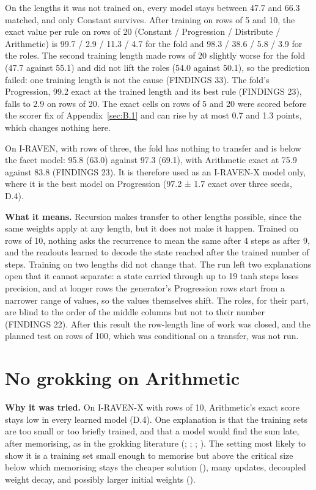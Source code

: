 On the lengths it was not trained on, every model stays between 47.7 and 66.3 matched, and only Constant survives. After training on rows of 5 and 10, the exact value per rule on rows of 20 (Constant / Progression / Distribute / Arithmetic) is 99.7 / 2.9 / 11.3 / 4.7 for the fold and 98.3 / 38.6 / 5.8 / 3.9 for the roles. The second training length made rows of 20 slightly worse for the fold (47.7 against 55.1) and did not lift the roles (54.0 against 50.1), so the prediction failed: one training length is not the cause (FINDINGS 33). The fold's Progression, 99.2 exact at the trained length and its best rule (FINDINGS 23), falls to 2.9 on rows of 20. The exact cells on rows of 5 and 20 were scored before the scorer fix of Appendix~\ref{sec:B.1} and can rise by at most 0.7 and 1.3 points, which changes nothing here.

On I-RAVEN, with rows of three, the fold has nothing to transfer and is below the facet model: 95.8 (63.0) against 97.3 (69.1), with Arithmetic exact at 75.9 against 83.8 (FINDINGS 23). It is therefore used as an I-RAVEN-X model only, where it is the best model on Progression (97.2 ± 1.7 exact over three seeds, D.4).

\textbf{What it means.} Recursion makes transfer to other lengths possible, since the same weights apply at any length, but it does not make it happen. Trained on rows of 10, nothing asks the recurrence to mean the same after 4 steps as after 9, and the readouts learned to decode the state reached after the trained number of steps. Training on two lengths did not change that. The run left two explanations open that it cannot separate: a state carried through up to 19 tanh steps loses precision, and at longer rows the generator's Progression rows start from a narrower range of values, so the values themselves shift. The roles, for their part, are blind to the order of the middle columns but not to their number (FINDINGS 22). After this result the row-length line of work was closed, and the planned test on rows of 100, which was conditional on a transfer, was not run.

\section{No grokking on Arithmetic}\label{sec:E.2}

\textbf{Why it was tried.} On I-RAVEN-X with rows of 10, Arithmetic's exact score stays low in every learned model (D.4). One explanation is that the training sets are too small or too briefly trained, and that a model would find the sum late, after memorising, as in the grokking literature (\citealp{power2022grokking}; \citealp{nanda2023progress}; \citealp{liu2023omnigrok}; \citealp{varma2023explaining}). The setting most likely to show it is a training set small enough to memorise but above the critical size below which memorising stays the cheaper solution (\citealp{varma2023explaining}), many updates, decoupled weight decay, and possibly larger initial weights (\citealp{liu2023omnigrok}).

